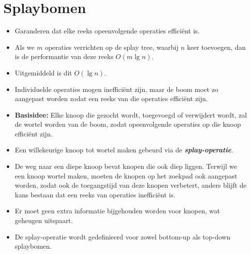 \section{Splaybomen}
\label{sec:splaybomen}
\begin{itemize}
    \item Garanderen dat elke reeks opeenvolgende operaties efficiënt is.
    \item Als we $m$ operaties verrichten op de splay tree, waarbij $n$ keer toevoegen, dan is de performantie van deze reeks $O(m \lg n)$. 
    \item Uitgemiddeld is dit $O(\lg n)$.
    \item Individuelde operaties mogen inefficiënt zijn, maar de boom moet zo aangepast worden zodat een reeks van die operaties efficiënt zijn.
    \item \textbf{Basisidee:} Elke knoop die gezocht wordt, toegevoegd of verwijdert wordt, zal de wortel worden van de boom, zodat opeenvolgende operaties op die knoop efficiënt zijn.
    \item Een willekeurige knoop tot wortel maken gebeurd via de \textbf{\textit{splay-operatie}}.
    \item De weg naar een diepe knoop bevat knopen die ook diep liggen. Terwijl we een knoop wortel maken, moeten de knopen op het zoekpad ook aangepast worden, zodat ook de toegangstijd van deze knopen verbetert, anders blijft de kans bestaan dat een reeks van operaties inefficiënt is.
    \item Er moet geen extra informatie bijgehouden worden voor knopen, wat geheugen uitspaart. 
    \item De splay-operatie wordt gedefinieerd voor zowel bottom-up als top-down splaybomen.
\end{itemize}

